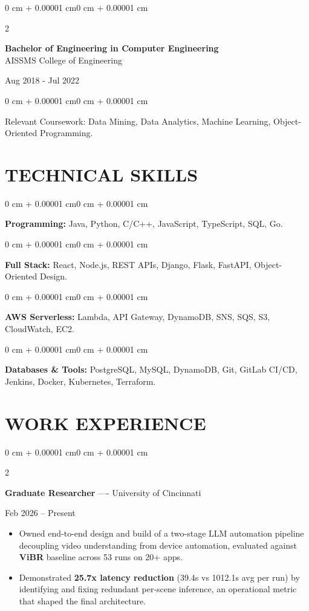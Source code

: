 \documentclass[10pt, letterpaper]{article}
\newenvironment{highlights}{
    \begin{itemize}[
        topsep=0.10 cm,
        parsep=0.06 cm,
        partopsep=0pt,
        itemsep=0.06 cm,
        leftmargin=12pt
    ]
}{
    \end{itemize}
}
\newenvironment{onecolentry}{
    \begin{adjustwidth}{0 cm + 0.00001 cm}{0 cm + 0.00001 cm}
}{
    \end{adjustwidth}
}
\newenvironment{twocolentry}[2][]{
    \onecolentry
    \def\secondColumn{#2}
    \setcolumnwidth{\fill, 4.5 cm}
    \begin{paracol}{2}
}{
    \switchcolumn \raggedleft \secondColumn
    \end{paracol}
    \endonecolentry
}
\begin{document}
\begin{twocolentry}{
    Aug 2018 - Jul 2022
}
    \textbf{Bachelor of Engineering in Computer Engineering} \\
    AISSMS College of Engineering
\end{twocolentry}
\begin{onecolentry}
Relevant Coursework: Data Mining, Data Analytics, Machine Learning, Object-Oriented Programming.
\end{onecolentry}
\section{TECHNICAL SKILLS}
\begin{onecolentry}
\textbf{Programming:} Java, Python, C/C++, JavaScript, TypeScript, SQL, Go.
\end{onecolentry}
\vspace{0.06 cm}
\begin{onecolentry}
\textbf{Full Stack:} React, Node.js, REST APIs, Django, Flask, FastAPI, Object-Oriented Design.
\end{onecolentry}
\vspace{0.06 cm}
\begin{onecolentry}
\textbf{AWS Serverless:} Lambda, API Gateway, DynamoDB, SNS, SQS, S3, CloudWatch, EC2.
\end{onecolentry}
\vspace{0.06 cm}
\begin{onecolentry}
\textbf{Databases \& Tools:} PostgreSQL, MySQL, DynamoDB, Git, GitLab CI/CD, Jenkins, Docker, Kubernetes, Terraform.
\end{onecolentry}

\section{WORK EXPERIENCE}
\begin{twocolentry}{Feb 2026 -- Present}
\textbf{Graduate Researcher} ---- University of Cincinnati
\end{twocolentry}
\begin{highlights}
  \item Owned end-to-end design and build of a two-stage LLM automation pipeline decoupling video understanding from device automation, evaluated against \textbf{ViBR} baseline across 53 runs on 20+ apps.
  \item Demonstrated \textbf{25.7x latency reduction} (39.4s vs 1012.1s avg per run) by identifying and fixing redundant per-scene inference, an operational metric that shaped the final architecture.
\end{highlights}
\end{document}
